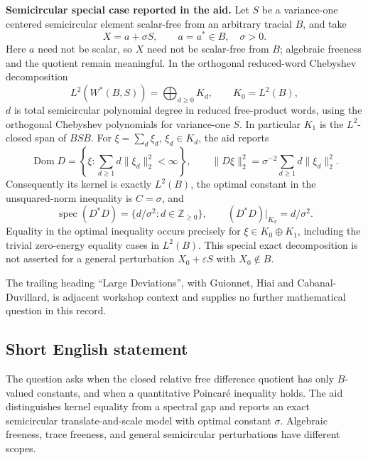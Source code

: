 \documentclass[11pt]{article}
\newcommand{\Z}{\mathbb{Z}}
\begin{document}
\textbf{Semicircular special case reported in the aid.} Let \(S\) be a variance-one centered semicircular element scalar-free from an arbitrary tracial \(B\), and take
\[
 X=a+\sigma S,\qquad a=a^*\in B,\quad\sigma>0.
\]
Here \(a\) need not be scalar, so \(X\) need not be scalar-free from \(B\); algebraic freeness and the quotient remain meaningful. In the orthogonal reduced-word Chebyshev decomposition
\[
 L^2(W^*(B,S))=\bigoplus_{d\ge0}K_d,\qquad K_0=L^2(B),
\]
\(d\) is total semicircular polynomial degree in reduced free-product words, using the orthogonal Chebyshev polynomials for variance-one \(S\). In particular \(K_1\) is the \(L^2\)-closed span of \(BSB\). For \(\xi=\sum_d\xi_d\), \(\xi_d\in K_d\), the aid reports
\[
 \operatorname{Dom}D=\left\{\xi:\sum_{d\ge1}d\|\xi_d\|_2^2<\infty\right\},\qquad
 \|D\xi\|_2^2=\sigma^{-2}\sum_{d\ge1}d\|\xi_d\|_2^2.
\]
Consequently its kernel is exactly \(L^2(B)\), the optimal constant in the unsquared-norm inequality is \(C=\sigma\), and
\[
 \operatorname{spec}(D^*D)=\{d/\sigma^2:d\in\Z_{\ge0}\},
 \qquad (D^*D)|_{K_d}=d/\sigma^2.
\]
Equality in the optimal inequality occurs precisely for \(\xi\in K_0\oplus K_1\), including the trivial zero-energy equality cases in \(L^2(B)\). This special exact decomposition is not asserted for a general perturbation \(X_0+\varepsilon S\) with \(X_0\notin B\).

The trailing heading ``Large Deviations'', with Guionnet, Hiai and Cabanal-Duvillard, is adjacent workshop context and supplies no further mathematical question in this record.
\subsection{Short English statement}
The question asks when the closed relative free difference quotient has only \(B\)-valued constants, and when a quantitative Poincar\'e inequality holds. The aid distinguishes kernel equality from a spectral gap and reports an exact semicircular translate-and-scale model with optimal constant \(\sigma\). Algebraic freeness, trace freeness, and general semicircular perturbations have different scopes.
\end{document}
